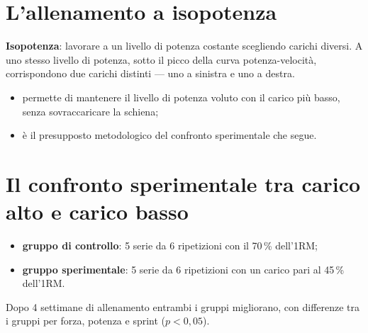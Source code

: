 \section{L'allenamento a isopotenza}

\textbf{Isopotenza}: lavorare a un livello di potenza costante scegliendo carichi diversi. A uno
stesso livello di potenza, sotto il picco della curva potenza-velocità, corrispondono due carichi
distinti --- uno a sinistra e uno a destra.
\begin{itemize}
  \item permette di mantenere il livello di potenza voluto con il carico più basso, senza
    sovraccaricare la schiena;
  \item è il presupposto metodologico del confronto sperimentale che segue.
\end{itemize}

\section{Il confronto sperimentale tra carico alto e carico basso}

\begin{itemize}
  \item \textbf{gruppo di controllo}: 5 serie da 6 ripetizioni con il 70\,\% dell'1RM;
  \item \textbf{gruppo sperimentale}: 5 serie da 6 ripetizioni con un carico pari al 45\,\%
    dell'1RM.
\end{itemize}

Dopo 4 settimane di allenamento entrambi i gruppi migliorano, con differenze tra i gruppi per forza,
potenza e sprint ($p < 0{,}05$).

